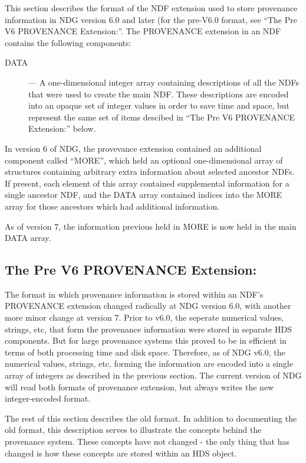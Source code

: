 \documentclass[twoside,11pt,nolof]{starlink}
\begin{document}
This section describes the format of the NDF extension used to
store provenance information in NDG version 6.0 and later (for the
pre-V6.0 format, see ``The Pre V6 PROVENANCE Extension:''. The
PROVENANCE extension in an NDF contains the following components:

\begin{description}

\item [DATA] --- A one-dimensional integer array containing descriptions
of all the NDFs that were used to create the main NDF. These descriptions
are encoded into an opaque set of integer values in order to save time
and space, but represent the same set of items descibed in ``The Pre V6
PROVENANCE Extension:'' below.

\end{description}

In version 6 of NDG, the provevance extension contained an additional
component called ``MORE'', which held an optional one-dimensional array
of structures containing arbitrary extra information about selected
ancestor NDFs. If present, each element of this array contained
supplemental information for a single ancestor NDF, and the DATA array
contained indices into the MORE array for those ancestors which had
additional information.

As of version 7, the information previous held in MORE is now held in the
main DATA array.


\subsection{The Pre V6 PROVENANCE Extension:}

The format in which provenance information is stored within an NDF's
PROVENANCE extension changed radically at NDG version 6.0, with another
more minor change at version 7. Prior to v6.0,
the seperate numerical values, strings, etc, that form the provenance
information were stored in separate HDS components. But for large
provenance systems this proved to be in efficient in terms of both
processing time and disk space. Therefore, as of NDG v6.0, the numerical
values, strings, etc, forming the information are encoded into a single
array of integers as described in the previous section. The current
version of NDG will read both formats of provenance extension, but always
writes the new integer-encoded format.

The rest of this section describes the old format. In addition to
documenting the old format, this description serves to illustrate the
concepts behind the provenance system. These concepts have not changed -
the only thing that has changed is how these concepts are stored within
an HDS object.
\end{document}
